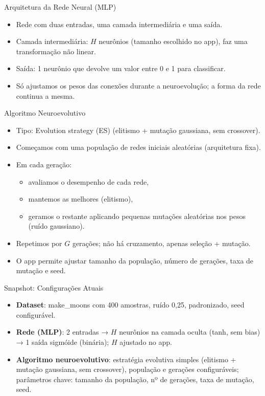 \documentclass[aspectratio=169]{beamer}
\begin{document}
\begin{frame}{Arquitetura da Rede Neural (MLP)}

\begin{itemize}
  \item Rede com duas entradas, uma camada intermediária e uma saída.
  \item Camada intermediária: $H$ neurônios (tamanho escolhido no app), faz uma transformação não linear.
  \item Saída: 1 neurônio que devolve um valor entre 0 e 1 para classificar.
  \item Só ajustamos os pesos das conexões durante a neuroevolução; a forma da rede continua a mesma.
\end{itemize}

\end{frame}

\begin{frame}{Algoritmo Neuroevolutivo}

\begin{itemize}
  \item Tipo: Evolution strategy (ES) (elitismo + mutação gaussiana, sem crossover).
  \item Começamos com uma população de redes iniciais aleatórias (arquitetura fixa).
  \item Em cada geração:
  \begin{itemize}
    \item avaliamos o desempenho de cada rede,
    \item mantemos as melhores (elitismo),
    \item geramos o restante aplicando pequenas mutações aleatórias nos pesos (ruído gaussiano).
  \end{itemize}
  \item Repetimos por $G$ gerações; não há cruzamento, apenas seleção + mutação.
  \item O app permite ajustar tamanho da população, número de gerações, taxa de mutação e seed.
\end{itemize}

\end{frame}



\begin{frame}{Snapshot: Configurações Atuais}

\begin{itemize}
  \item \textbf{Dataset}: make\_moons com 400 amostras, ruído 0{,}25, padronizado, seed configurável.
  \item \textbf{Rede (MLP)}: 2 entradas → $H$ neurônios na camada oculta (tanh, sem bias) → 1 saída sigmóide (binária); $H$ ajustado no app.
  \item \textbf{Algoritmo neuroevolutivo}: estratégia evolutiva simples (elitismo + mutação gaussiana, sem crossover), população e gerações configuráveis; parâmetros chave: tamanho da população, nº de gerações, taxa de mutação, seed.
\end{itemize}

\end{frame}
\end{document}
